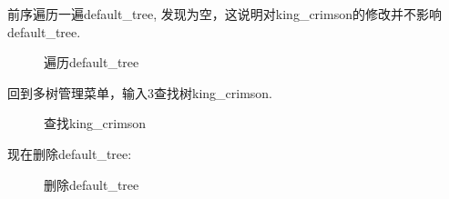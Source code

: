 \documentclass[supercite]{Experimental_Report}
\theoremstyle{definition}
\begin{document}
\clearpage
\noindent
前序遍历一遍default\_tree, 发现为空，这说明对king\_crimson的修改并不影响default\_tree.
\begin{figure}[htbp]
	\centering
	\centering
	\caption{遍历default\_tree}
	\label{fig5-91}
\end{figure}

\noindent
回到多树管理菜单，输入3查找树king\_crimson.
\begin{figure}[htbp]
	\centering
	\centering
	\caption{查找king\_crimson}
	\label{fig5-92}
\end{figure}

\noindent
现在删除default\_tree:
\begin{figure}[htbp]
	\centering
	\centering
	\caption{删除default\_tree}
	\label{fig5-93}
\end{figure}
\end{document}
